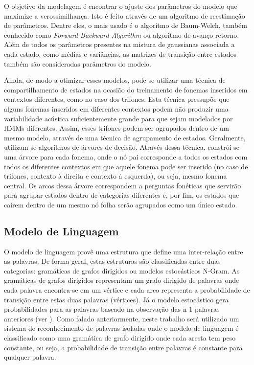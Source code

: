 \documentclass[12pt,a4paper,oneside]{report}
\begin{document}
O objetivo da modelagem é encontrar o ajuste dos parâmetros do modelo que maximize a verossimilhança. Isto é feito através de um algoritmo de reestimação de parâmetros. Dentre eles, o mais usado é o algoritmo de Baum-Welch, também conhecido como \emph{Forward-Backward Algorithm} ou algoritmo de avanço-retorno.
Além de todos os parâmetros presentes na mistura de gaussianas associada a cada estado, como médias e variâncias, as matrizes de transição entre estados também são consideradas parâmetros do modelo.

Ainda, de modo a otimizar esses modelos, pode-se utilizar uma técnica de compartilhamento de estados na ocasião do treinamento de fonemas inseridos em contextos diferentes, como no caso dos trifones. Esta técnica pressupõe que alguns fonemas inseridos em diferentes contextos podem não produzir uma variabilidade acústica suficientemente grande para que sejam modelados por HMMs diferentes. Assim, esses trifones podem ser agrupados dentro de um mesmo modelo, através de uma técnica de agrupamento de estados. Geralmente, utilizam-se algoritmos de árvores de decisão.
Através dessa técnica, constrói-se uma árvore para cada fonema, onde o nó pai corresponde a todos os estados com todos os diferentes contextos em que aquele fonema pode ser inserido (no caso de trifones, contexto à direita e contexto à esquerda), ou seja, mesmo fonema central. Os arcos dessa árvore correspondem a perguntas fonéticas que servirão para agrupar estados dentro de categorias diferentes e, por fim, os estados que caírem dentro de um mesmo nó folha serão agrupados como um único estado.

\subsection{Modelo de Linguagem}

O modelo de linguagem provê uma estrutura que define uma inter-relação entre as palavras. De forma geral, estas estruturas são classificadas entre duas categorias: gramáticas de grafos dirigidos ou modelos estocásticos N-Gram. As gramáticas de grafos dirigidos representam um grafo dirigido de palavras onde cada palavra encontra-se em um vértice e cada arco representa a probabilidade de transição entre estas duas palavras (vértices). Já o modelo estocástico gera probabilidades para as palavras baseado na observação das n-1 palavras anteriores (ver \cite{fsr}). Como falado anteriormente, neste trabalho será utilizado um sistema de reconhecimento de palavras isoladas onde o modelo de linguagem é classificado como uma gramática de grafo dirigido onde cada aresta tem peso constante, ou seja, a probabilidade de transição entre palavras é constante para qualquer palavra.
\end{document}
